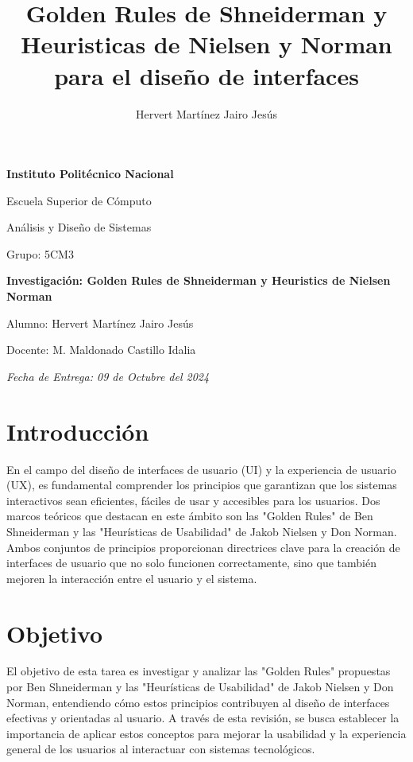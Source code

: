 \documentclass[10pt]{osa-supplemental-document}
\title{Golden Rules de Shneiderman y Heuristicas de Nielsen y Norman para el diseño de interfaces}
\author{Hervert Martínez Jairo Jesús}
\begin{document}
\begin{titlepage}
\centering
\vspace*{1cm}

\Huge  %
\textbf{Instituto Politécnico Nacional}

\vspace{0.5cm}
\LARGE
Escuela Superior de Cómputo
\vspace{1.5cm}

\LARGE
Análisis y Diseño de Sistemas
\vspace{1.5cm}

\LARGE
Grupo: 5CM3
\vspace{1.5cm}

\huge\textbf{Investigación: Golden Rules de Shneiderman y Heuristics de Nielsen Norman}
\vspace{1.5cm}

\LARGE
Alumno: Hervert Martínez Jairo Jesús
\vspace{1.5cm}

Docente: M. Maldonado Castillo Idalia

\vfill

\LARGE
\textit{Fecha de Entrega: 09 de Octubre del 2024}

\end{titlepage}

{
  \hypersetup{linkcolor=black}
  \tableofcontents
}

\maketitle

\section{Introducción}
En el campo del diseño de interfaces de usuario (UI) y la experiencia de usuario (UX), es fundamental comprender los principios que garantizan que los sistemas interactivos sean eficientes, fáciles de usar y accesibles para los usuarios. Dos marcos teóricos que destacan en este ámbito son las "Golden Rules" de Ben Shneiderman y las "Heurísticas de Usabilidad" de Jakob Nielsen y Don Norman. Ambos conjuntos de principios proporcionan directrices clave para la creación de interfaces de usuario que no solo funcionen correctamente, sino que también mejoren la interacción entre el usuario y el sistema.

\section{Objetivo}
El objetivo de esta tarea es investigar y analizar las "Golden Rules" propuestas por Ben Shneiderman y las "Heurísticas de Usabilidad" de Jakob Nielsen y Don Norman, entendiendo cómo estos principios contribuyen al diseño de interfaces efectivas y orientadas al usuario. A través de esta revisión, se busca establecer la importancia de aplicar estos conceptos para mejorar la usabilidad y la experiencia general de los usuarios al interactuar con sistemas tecnológicos.
\end{document}
